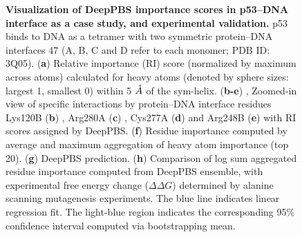 \begin{center}
    \begin{figure}
        \caption[ Visualization of DeepPBS importance scores in p53–DNA interface as a case study, and experimental validation. ]{\textbf{ Visualization of DeepPBS importance scores in p53–DNA interface as a case study, and experimental validation. } p53 binds to DNA as a tetramer with
two symmetric protein–DNA interfaces 47 (A, B, C and D refer to each monomer; PDB ID: 3Q05). ({\bf a})  Relative importance (RI) score (normalized by maximum across atoms) calculated for heavy atoms (denoted by sphere sizes: largest 1, smallest 0) within 5 $\AA$  of the sym-helix. ({\bf b-e}) , Zoomed-in view of specific interactions by protein–DNA interface residues Lys120B ({\bf b}) , Arg280A ({\bf c}) , Cys277A ({\bf d})  and Arg248B ({\bf e})  with RI scores assigned by DeepPBS. ({\bf f})  Residue importance computed by average and maximum aggregation of heavy atom importance (top 20). ({\bf g})  DeepPBS prediction. ({\bf h})  Comparison of log sum aggregated residue importance computed from DeepPBS ensemble, with experimental free energy
change ($\Delta\Delta G$) determined by alanine scanning mutagenesis experiments. The blue line indicates linear regression fit. The light-blue region indicates the corresponding 95\% confidence interval computed via bootstrapping mean.}
  \label{fig:pdna4}
\end{figure}
\end{center}

